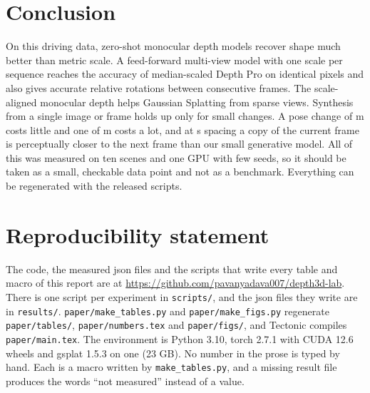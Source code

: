 \documentclass[10pt]{article}
\newcommand{\gpu}{\GPUname}
\begin{document}
\section{Conclusion}
\label{sec:conclusion}

On this driving data, zero-shot monocular depth models recover shape much better than metric scale. A
feed-forward multi-view model with one scale per sequence reaches the accuracy of median-scaled Depth Pro on
identical pixels and
also gives accurate relative rotations between consecutive frames. The scale-aligned monocular depth helps
Gaussian Splatting from sparse views. Synthesis from a single image or frame holds up only for small
changes. A pose change of \SharpSweepmotion{} m costs little and one of \SharpKeymotion{} m costs a lot,
and at \NFdtMedian{} s spacing a copy of the current frame is perceptually closer to the next frame than
our small generative model. All of this was measured on ten scenes and one GPU with few seeds, so it should
be taken as a small, checkable data point and not as a benchmark. Everything can be regenerated with the
released scripts.

\section*{Reproducibility statement}

The code, the measured json files and the scripts that write every table and macro of this report are at
\url{https://github.com/pavanyadava007/depth3d-lab}. There is one script per experiment in
\texttt{scripts/}, and the json files they write are in \texttt{results/}. \texttt{paper/make\_tables.py}
and \texttt{paper/make\_figs.py} regenerate \texttt{paper/tables/}, \texttt{paper/numbers.tex} and
\texttt{paper/figs/}, and Tectonic compiles \texttt{paper/main.tex}. The environment is Python 3.10, torch
2.7.1 with CUDA 12.6 wheels and gsplat 1.5.3 on one \gpu{} (23 GB). No number in the prose is typed by
hand. Each is a macro written by \texttt{make\_tables.py}, and a missing result file produces the words
``not measured'' instead of a value.

{\footnotesize\setlength{\bibsep}{1.5pt}

}
\end{document}
